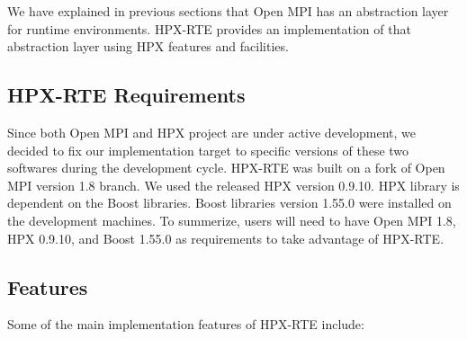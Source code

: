 \iffalse

We have explained in previous sections that Open MPI has an abstraction layer for runtime environments. HPX-RTE provides an implementation of that abstraction layer using HPX features and facilities.

\subsection{HPX-RTE Requirements}
Since both Open MPI and HPX project are under active development, we decided to fix our implementation target to specific versions of these two softwares during the development cycle. HPX-RTE was built on a fork of Open MPI version 1.8 branch. We used the released HPX version 0.9.10. HPX library is dependent on the Boost libraries. Boost libraries version 1.55.0 were installed on the development machines.
To summerize, users will need to have Open MPI 1.8, HPX 0.9.10, and Boost 1.55.0 as requirements to take advantage of HPX-RTE.

\subsection{Features}
Some of the main implementation features of HPX-RTE include:

